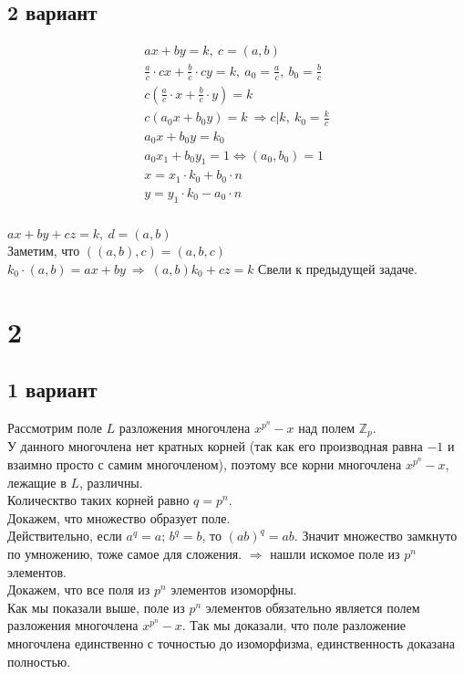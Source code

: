 	\subsection{2 вариант}
		\begin{gather*}
			ax + by = k,\ c = (a, b)\\
			\frac{a}{c} \cdot cx + \frac{b}{c} \cdot cy = k,\ a_0 = \frac{a}{c},\ b_0 = \frac{b}{c}\\
			c(\frac{a}{c} \cdot x + \frac{b}{c} \cdot y) = k\\
			c(a_0 x + b_0 y) = k \ \Rightarrow c | k,\ k_0 = \frac{k}{c}\\
			a_0 x + b_0 y = k_0\\
			a_0 x_1 + b_0 y_1 = 1 \Leftrightarrow (a_0, b_0) = 1\\
			x = x_1 \cdot k_0 + b_0 \cdot n\\
			y = y_1 \cdot k_0 - a_0 \cdot n\\
		\end{gather*}
		\\
		$ax + by + cz = k,\ d = (a, b)$\\
		Заметим, что $((a, b), c) = (a, b, c)$\\
		$k_0 \cdot (a, b) = ax + by \ \Rightarrow \ (a, b)k_0 + cz = k$ Свели к предыдущей задаче.
		
		
\newpage
\section{2}
	\subsection{1 вариант}
		Рассмотрим поле $L$ разложения многочлена $x^{p^n} - x$ над полем $\mathbb{Z}_p$.\\
		У данного многочлена нет кратных корней (так как его производная равна $-1$ и взаимно просто с самим многочленом), поэтому все корни многочлена $x^{p^n} - x$, лежащие в $L$, различны.\\
		Колическтво таких корней равно $q = p^n$.\\ 
		Докажем, что множество образует поле.\\ 
		Действительно, если $a^q = a$; $b^q = b$, то $(ab)^q = ab$. Значит множество замкнуто по умножению, тоже самое для сложения. $\Rightarrow$ нашли искомое поле из $p^n$ элементов.\\
		Докажем, что все поля из $p^n$ элементов изоморфны.\\
		Как мы показали выше, поле из $p^n$ элементов обязательно является полем разложения многочлена $x^{p^n} - x$. Так мы доказали, что поле разложение многочлена единственно с точностью до изоморфизма, единственность доказана полностью.
		
